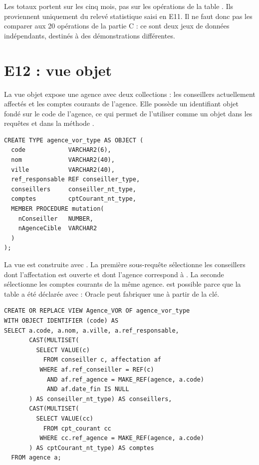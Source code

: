 \begin{remarquebox}
Les totaux portent sur les cinq mois, pas sur les opérations de la table
. Ils proviennent uniquement du relevé statistique saisi en
E11. Il ne faut donc pas les comparer aux 20 opérations de la partie C : ce
sont deux jeux de données indépendants, destinés à des démonstrations
différentes.
\end{remarquebox}

\section{E12 : vue objet }

La vue objet  expose une agence avec deux collections : les
conseillers actuellement affectés et les comptes courants de l'agence. Elle
possède un identifiant objet fondé sur le code de l'agence, ce qui permet de
l'utiliser comme un objet dans les requêtes et dans la méthode
.

\begin{lstlisting}[caption={Type de la vue objet \code{Agence\_VOR}.},label={lst:e12-type}]
CREATE TYPE agence_vor_type AS OBJECT (
  code            VARCHAR2(6),
  nom             VARCHAR2(40),
  ville           VARCHAR2(40),
  ref_responsable REF conseiller_type,
  conseillers     conseiller_nt_type,
  comptes         cptCourant_nt_type,
  MEMBER PROCEDURE mutation(
    nConseiller   NUMBER,
    nAgenceCible  VARCHAR2
  )
);
\end{lstlisting}

La vue est construite avec . La première
sous-requête sélectionne les conseillers dont l'affectation est ouverte et dont
l'agence correspond à . La seconde sélectionne
les comptes courants de la même agence.  est possible parce que
la table  a été déclarée avec
 : Oracle peut fabriquer une
 à partir de la clé.

\begin{lstlisting}[caption={Création de la vue objet \code{Agence\_VOR}.},label={lst:e12-vue}]
CREATE OR REPLACE VIEW Agence_VOR OF agence_vor_type
WITH OBJECT IDENTIFIER (code) AS
SELECT a.code, a.nom, a.ville, a.ref_responsable,
       CAST(MULTISET(
         SELECT VALUE(c)
           FROM conseiller c, affectation af
          WHERE af.ref_conseiller = REF(c)
            AND af.ref_agence = MAKE_REF(agence, a.code)
            AND af.date_fin IS NULL
       ) AS conseiller_nt_type) AS conseillers,
       CAST(MULTISET(
         SELECT VALUE(cc)
           FROM cpt_courant cc
          WHERE cc.ref_agence = MAKE_REF(agence, a.code)
       ) AS cptCourant_nt_type) AS comptes
  FROM agence a;
\end{lstlisting}

